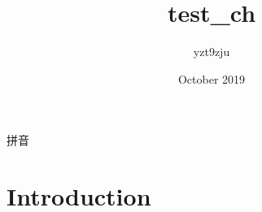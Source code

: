 \documentclass{article}
\title{test\_ch}
\author{yzt9zju }
\date{October 2019}
\begin{document}
\maketitle

拼音

\section{Introduction}
\end{document}
